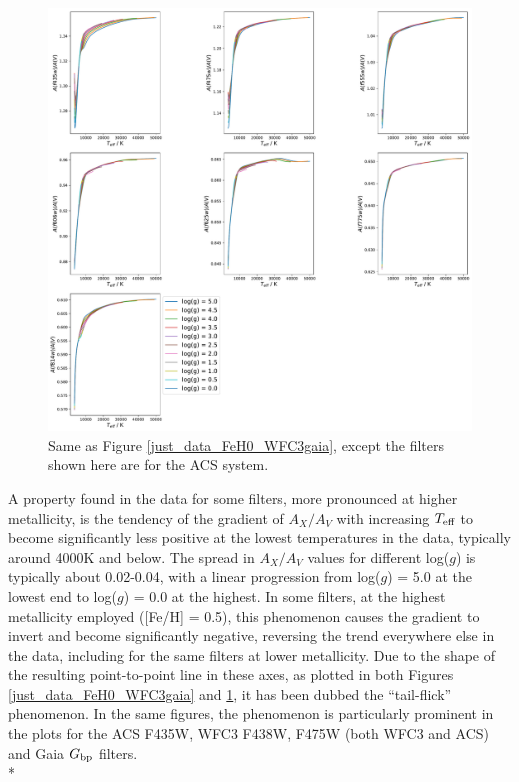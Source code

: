 \documentclass[12pt, a4paper]{report}
\begin{document}
\begin{figure}[h]
\begin{center}
\includegraphics[width=1.0\textwidth]{../just_full_data/ACS/AHub_FeH0p0_just_Teff_plot_lines.pdf}
\caption{Same as Figure \ref{just_data_FeH0_WFC3gaia}, except the filters shown here are for the ACS system.}
\label{just_data_FeH0_ACS}
\end{center}
\end{figure}

A property found in the data for some filters, more pronounced at higher metallicity, is the tendency of the gradient of $A_{X}/A_{V}$ with increasing $T_{\textnormal{eff}}$ to become significantly less positive at the lowest temperatures in the data, typically around 4000K and below. The spread in $A_{X}/A_{V}$ values for different log($g$) is typically about 0.02-0.04, with a linear progression from log($g$) = 5.0 at the lowest end to log($g$) = 0.0 at the highest. In some filters, at the highest metallicity employed ([Fe/H] = 0.5), this phenomenon causes the gradient to invert and become significantly negative, reversing the trend everywhere else in the data, including for the same filters at lower metallicity. Due to the shape of the resulting point-to-point line in these axes, as plotted in both Figures \ref{just_data_FeH0_WFC3gaia} and \ref{just_data_FeH0_ACS}, it has been dubbed the ``tail-flick'' phenomenon. In the same figures, the phenomenon is particularly prominent in the plots for the ACS F435W, WFC3 F438W, F475W (both WFC3 and ACS) and Gaia $G_{\textnormal{bp}}$ filters.\\*
\end{document}
